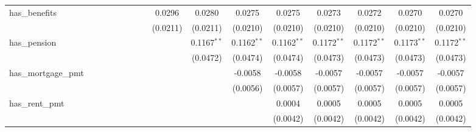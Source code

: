 \begin{table}[htbp]
\begin{tiny}
\begin{tabular}{lccccccccccccccc}
         has\_benefits           &                 &                 &                 &                 &                 &                 &                 & 0.0296          & 0.0280          & 0.0275          & 0.0275          & 0.0273          & 0.0272          & 0.0270          & 0.0270\\
                                  &                 &                 &                 &                 &                 &                 &                 & (0.0211)        & (0.0211)        & (0.0210)        & (0.0210)        & (0.0210)        & (0.0210)        & (0.0210)        & (0.0210)\\
         has\_pension            &                 &                 &                 &                 &                 &                 &                 &                 & 0.1167$^{**}$   & 0.1162$^{**}$   & 0.1162$^{**}$   & 0.1172$^{**}$   & 0.1172$^{**}$   & 0.1173$^{**}$   & 0.1172$^{**}$\\
                                  &                 &                 &                 &                 &                 &                 &                 &                 & (0.0472)        & (0.0474)        & (0.0474)        & (0.0473)        & (0.0473)        & (0.0473)        & (0.0473)\\
         has\_mortgage\_pmt     &                 &                 &                 &                 &                 &                 &                 &                 &                 & -0.0058         & -0.0058         & -0.0057         & -0.0057         & -0.0057         & -0.0057\\
                                  &                 &                 &                 &                 &                 &                 &                 &                 &                 & (0.0056)        & (0.0057)        & (0.0057)        & (0.0057)        & (0.0057)        & (0.0057)\\
         has\_rent\_pmt         &                 &                 &                 &                 &                 &                 &                 &                 &                 &                 & 0.0004          & 0.0005          & 0.0005          & 0.0005          & 0.0005\\
                                  &                 &                 &                 &                 &                 &                 &                 &                 &                 &                 & (0.0042)        & (0.0042)        & (0.0042)        & (0.0042)        & (0.0042)\\

\end{tabular}
\end{tiny}
\end{table}
